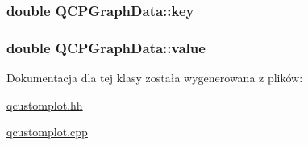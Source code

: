 \subsubsection[{\texorpdfstring{key}{key}}]{\setlength{\rightskip}{0pt plus 5cm}double Q\+C\+P\+Graph\+Data\+::key}\hypertarget{class_q_c_p_graph_data_a2fcebdf84af975761c0661237d7e28ec}{}\label{class_q_c_p_graph_data_a2fcebdf84af975761c0661237d7e28ec}
\subsubsection[{\texorpdfstring{value}{value}}]{\setlength{\rightskip}{0pt plus 5cm}double Q\+C\+P\+Graph\+Data\+::value}\hypertarget{class_q_c_p_graph_data_ac97e3ddbdcbe0b58d0b4d6f95250d59c}{}\label{class_q_c_p_graph_data_ac97e3ddbdcbe0b58d0b4d6f95250d59c}


Dokumentacja dla tej klasy została wygenerowana z plików\+:\begin{DoxyCompactItemize}
\item 
\hyperlink{qcustomplot_8hh}{qcustomplot.\+hh}\item 
\hyperlink{qcustomplot_8cpp}{qcustomplot.\+cpp}\end{DoxyCompactItemize}
